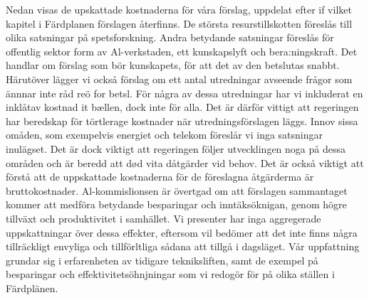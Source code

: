 {{{{{Nedan visas de upskattade kostnaderna för våra förslag, uppdelat efter if vilket kapitel i Färdplanen förslagen återfinns. De största resurstillskotten föreslås till olika satsningar på spetsforskning. Andra betydande satsningar föreslås för offentlig sektor form av Al-verkstaden, ett kunskapslyft och bera:ningskraft. Det handlar om förslag som bör kunskapets, för att det av den betslutas snabbt. Härutöver lägger vi också förslag om ett antal utredningar avseende frågor som ännnar inte råd reö for betsl. För några av dessa utredningar har vi inkluderat en inklåtav kostnad it bællen, dock inte för alla. Det är därför vittigt att regeringen har beredskap för törtlerage kostnader när utredningsförslagen läggs. Innov sissa omåden, som exempelvis energiet och telekom föreslår vi inga satsningar inulägset. Det är dock viktigt att regeringen följer utvecklingen noga på dessa områden och är beredd att død vita dåtgärder vid behov.
Det är också viktigt att förstå att de uppskattade kostnaderna för de föreslagna åtgärderma är bruttokostnader. Al-kommislionsen är övertgad om att förslagen sammantaget kommer att medföra betydande besparingar och inntäksöknigan, genom högre tillväxt och produktivitet i samhället. Vi presenter har inga aggregerade uppskattningar över dessa effekter, eftersom vil bedömer att det inte finns några tillräckligt envyliga och tillförltliga sådana att tillgå i dagsläget. Vår uppfattning grundar sig i erfarenheten av tidigare tekniksliften, samt de exempel på besparingar och effektivitetsöhnjningar som vi redogör för på olika ställen i Färdplänen.
}}}}}
